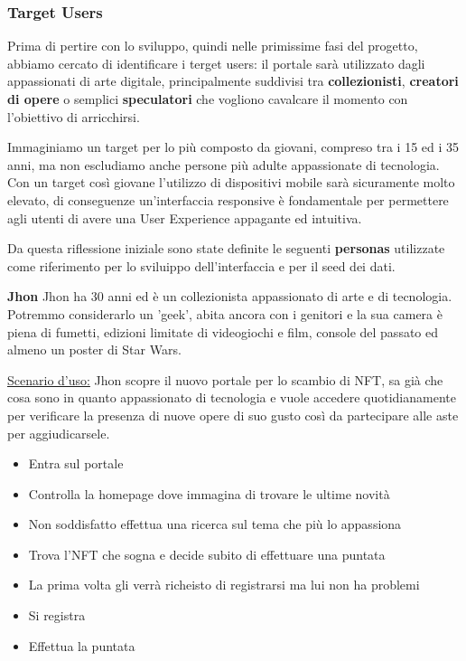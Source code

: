 \subsubsection{Target Users}
Prima di pertire con lo sviluppo, quindi nelle primissime fasi del progetto, abbiamo cercato di identificare i terget users:
il portale sarà utilizzato dagli appassionati di arte digitale, principalmente suddivisi tra \textbf{collezionisti}, \textbf{creatori di opere} 
o semplici \textbf{speculatori} che vogliono cavalcare il momento con l'obiettivo di arricchirsi.

Immaginiamo un target per lo più composto da giovani, compreso tra i 15 ed i 35 anni, ma non escludiamo anche persone più adulte appassionate di tecnologia.
Con un target così giovane l'utilizzo di dispositivi mobile sarà sicuramente molto elevato,
di conseguenze un'interfaccia responsive è fondamentale per permettere agli utenti di avere una User Experience appagante ed intuitiva. 

Da questa riflessione iniziale sono state definite le seguenti \textbf{personas} 
utilizzate come riferimento per lo sviluippo dell'interfaccia e per il seed dei dati.

\bigbreak
\noindent
\textbf{Jhon}
\bigbreak
\noindent
Jhon ha 30 anni ed è un collezionista appassionato di arte e di tecnologia. 
Potremmo considerarlo un 'geek', abita ancora con i genitori e la sua camera è piena di fumetti, 
edizioni limitate di videogiochi e film, console del passato ed almeno un poster di Star Wars.

\underline{Scenario d'uso:}
Jhon scopre il nuovo portale per lo scambio di NFT, 
sa già che cosa sono in quanto appassionato di tecnologia 
e vuole accedere quotidianamente per verificare la presenza di nuove opere di suo gusto
così da partecipare alle aste per aggiudicarsele.

\begin{itemize}
	\item Entra sul portale
	\item Controlla la homepage dove immagina di trovare le ultime novità
	\item Non soddisfatto effettua una ricerca sul tema che più lo appassiona
	\item Trova l'NFT che sogna e decide subito di effettuare una puntata
	\item La prima volta gli verrà richeisto di registrarsi ma lui non ha problemi 
	\item Si registra 
	\item Effettua la puntata
\end{itemize}

